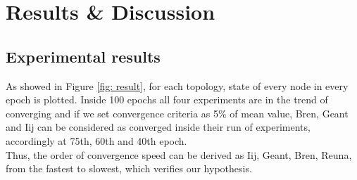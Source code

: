 \section{Results \& Discussion}
\subsection{Experimental results}
As showed in Figure \ref{fig: result}, for each topology, state of every node in every epoch is plotted. Inside 100 epochs all four experiments are in the trend of converging and if we set convergence criteria as 5\% of mean value, Bren, Geant and Iij can be considered as converged inside their run of experiments, accordingly at 75th, 60th and 40th epoch.\\
Thus, the order of convergence speed can be derived as Iij, Geant, Bren, Reuna, from the fastest to slowest, which verifies our hypothesis.
